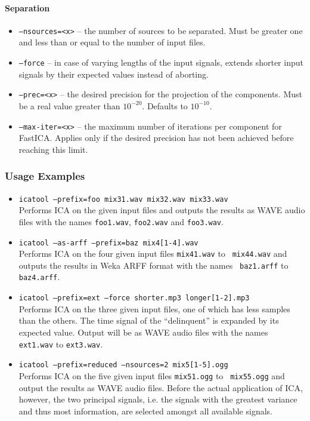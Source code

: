 \paragraph{Separation}

\begin{itemize}
  \item {\tt --nsources=<x>} -- the number of sources to be separated. Must be
    greater one and less than or equal to the number of input files.
  \item {\tt --force} -- in case of varying lengths of the input signals,
    extends shorter input signals by their expected values instead of aborting.
  \item {\tt --prec=<x>} -- the desired precision for the projection of the
    components. Must be a real value greater than $10^{-20}$. Defaults to
    $10^{-10}$.
  \item {\tt --max-iter=<x>} -- the maximum number of iterations per component
    for FastICA. Applies only if the desired precision has not been achieved
    before reaching this limit.
\end{itemize}


\subsubsection{Usage Examples}

\begin{itemize}
  \item {\tt icatool --prefix=foo mix31.wav mix32.wav mix33.wav}\\
    Performs ICA on the given input files and outputs the results as WAVE audio
    files with the names {\tt foo1.wav}, {\tt foo2.wav} and {\tt foo3.wav}.
  \item {\tt icatool --as-arff --prefix=baz mix4[1-4].wav}\\ 
    Performs ICA on the four given input files {\tt mix41.wav} to {\tt
    mix44.wav} and outputs the results in Weka ARFF format with the names {\tt
    baz1.arff} to {\tt baz4.arff}.
  \item {\tt icatool --prefix=ext --force shorter.mp3 longer[1-2].mp3}\\
    Performs ICA on the three given input files, one of which has less samples
    than the others. The time signal of the ``delinquent'' is expanded by its
    expected value. Output will be as WAVE audio files with the names {\tt
      ext1.wav} to {\tt ext3.wav}.
  \item {\tt icatool --prefix=reduced --nsources=2 mix5[1-5].ogg}\\
    Performs ICA on the five given input files {\tt mix51.ogg} to {\tt
      mix55.ogg} and output the results as WAVE audio files. Before the actual
    application of ICA, however, the two principal signals, i.e. the signals
    with the greatest variance and thus most information, are selected amongst
    all available signals.
\end{itemize}


